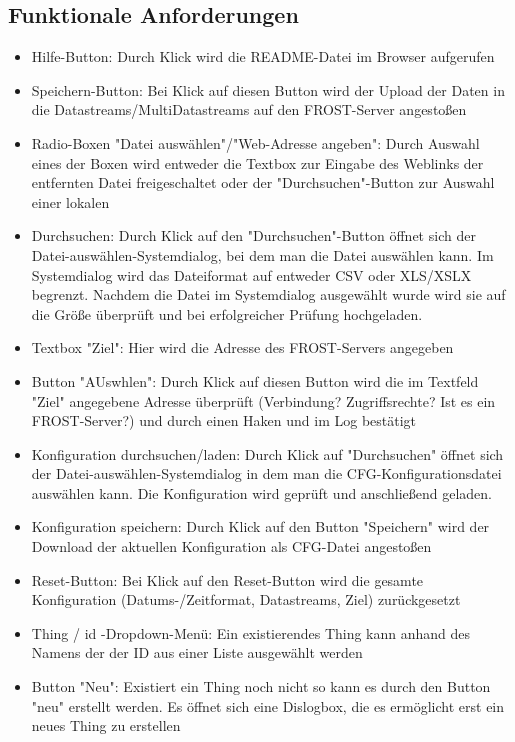 \documentclass[12 pt]{article}
\begin{document}
\subsection{Funktionale Anforderungen}
\begin{itemize}
	

\item Hilfe-Button: Durch Klick wird die README-Datei im Browser aufgerufen
\item Speichern-Button: Bei Klick auf diesen Button wird der Upload der Daten in die Datastreams/MultiDatastreams auf den FROST-Server angestoßen

\item Radio-Boxen "Datei auswählen"/"Web-Adresse angeben": Durch Auswahl eines der Boxen wird entweder die Textbox zur Eingabe des Weblinks der entfernten Datei freigeschaltet oder der "Durchsuchen"-Button zur Auswahl einer lokalen
\item Durchsuchen: Durch Klick auf den "Durchsuchen"-Button öffnet sich der Datei-auswählen-Systemdialog, bei dem man die Datei auswählen kann. Im Systemdialog wird das Dateiformat auf entweder CSV oder XLS/XSLX begrenzt. Nachdem die Datei im Systemdialog ausgewählt wurde wird sie auf die Größe überprüft und bei erfolgreicher Prüfung  hochgeladen.

\item Textbox "Ziel": Hier wird die Adresse des FROST-Servers angegeben
\item Button "AUswhlen": Durch Klick auf diesen Button wird die im Textfeld "Ziel" angegebene Adresse überprüft (Verbindung? Zugriffsrechte? Ist es ein FROST-Server?) und durch einen Haken und im Log bestätigt

\item Konfiguration durchsuchen/laden: Durch Klick auf "Durchsuchen" öffnet sich der Datei-auswählen-Systemdialog in dem man die CFG-Konfigurationsdatei auswählen kann. Die Konfiguration wird geprüft und anschließend geladen.
\item Konfiguration speichern: Durch Klick auf den Button "Speichern" wird der Download der aktuellen Konfiguration als CFG-Datei angestoßen
\item Reset-Button: Bei Klick auf den Reset-Button wird die gesamte Konfiguration (Datums-/Zeitformat, Datastreams, Ziel) zurückgesetzt

\item Thing / id -Dropdown-Menü: Ein existierendes Thing kann anhand des Namens der der ID aus einer Liste ausgewählt werden
\item Button "Neu": Existiert ein Thing noch nicht so kann es durch den Button "neu" erstellt werden. Es öffnet sich eine Dislogbox, die es ermöglicht erst ein neues Thing zu erstellen


\end{itemize}
\end{document}
